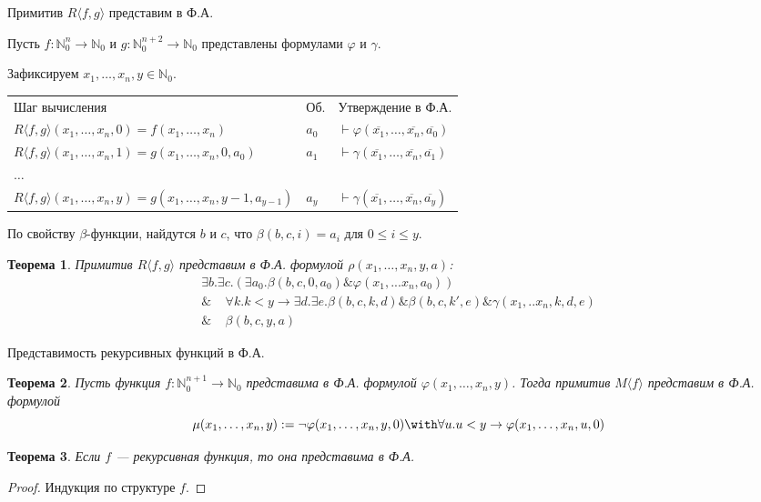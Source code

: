 \documentclass[aspectratio=169]{beamer}
\newtheorem{thm}{Теорема}[section]
\begin{document}
\begin{frame}{Примитив $R\langle f,g\rangle$ представим в Ф.А.}

Пусть $f: \mathbb{N}^n_0\to\mathbb{N}_0$ и $g:\mathbb{N}^{n+2}_0\to\mathbb{N}_0$ представлены формулами $\varphi$ и $\gamma$. 

Зафиксируем $x_1, \dots, x_n, y \in \mathbb{N}_0$.\pause\vspace{0.3cm}

\begin{tabular}{lll}
Шаг вычисления & Об. & Утверждение в Ф.А.\\
$R\langle f,g\rangle (x_1,\dots,x_n,0) = f(x_1,\dots,x_n)$ & $a_0$ & $\vdash \varphi(\overline{x_1},\dots,\overline{x_n},\overline{a_0})$\\ \pause
$R\langle f,g\rangle (x_1,\dots,x_n,1) = g(x_1,\dots,x_n,0,a_0)$ & $a_1$ & $\vdash \gamma(\overline{x_1},\dots,\overline{x_n},\overline{a_1})$\\ \pause
$\dots$\\
$R\langle f,g\rangle (x_1,\dots,x_n,y) = g(x_1,\dots,x_n,y-1,a_{y-1})$ & $a_y$ & $\vdash \gamma(\overline{x_1},\dots,\overline{x_n},\overline{a_y})$
\end{tabular}\pause\vspace{0.3cm}

По свойству $\beta$-функции, найдутся $b$ и $c$, что
$\beta (b,c,i) = a_i$ для $0 \le i \le y$.\pause

\begin{thm}Примитив $R\langle f,g\rangle$ представим в Ф.А. формулой $\rho(x_1,\dots,x_n,y,a)$:\vspace{-0.1cm}
$$\begin{array}{l}\exists b. \exists c. (\exists a_0. \beta (b,c,0,a_0) \& \varphi (x_1,...x_n, a_0)) \\
       \&\;\;\;\;\forall k.k < y \rightarrow \exists d . \exists e . \beta (b,c,k,d) \& \beta (b,c,k',e) \& \gamma (x_1,..x_n,k,d,e) \\
       \&\;\;\;\;\beta (b,c,y,a) 
\end{array}$$
\end{thm}
\end{frame}

\begin{frame}{Представимость рекурсивных функций в Ф.А.}
\begin{thm}Пусть функция $f:\mathbb{N}^{n+1}_0 \to \mathbb{N}_0$ представима в Ф.А.
формулой $\varphi(x_1,\dots,x_n,y)$. Тогда примитив $M\langle f\rangle$ представим в Ф.А. 
формулой $$\mu(x_1,\dots,x_n,y) := \neg\varphi(x_1,\dots,x_n,y,0) \with \forall u.u < y \to \varphi(x_1,\dots,x_n,u,0)$$
\end{thm}\pause

\begin{thm}Если $f$ --- рекурсивная функция, то она представима
в Ф.А.
\end{thm}
\begin{proof}Индукция по структуре $f$.
\end{proof}
\end{frame}
\end{document}
